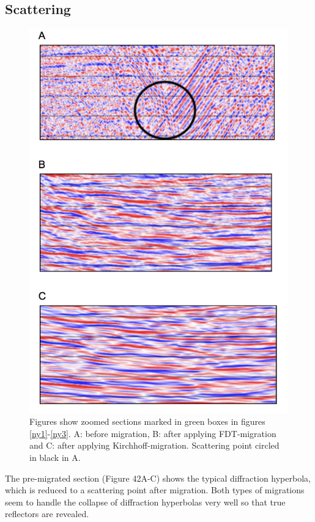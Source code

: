 \documentclass[10pt,a4paper]{article}
\begin{document}
\subsection{Scattering}

\begin{figure}[H]
\includegraphics[scale=0.4]{ny7.jpg}
\caption{Figures show zoomed sections marked in green boxes in figures \ref{ny1}-\ref{ny3}. 
A: before migration, B: after applying FDT-migration and C: after applying Kirchhoff-migration. Scattering point circled in black in A.}
\label{ny7}
\end{figure}

\noindent The pre-migrated section (Figure 42A-C) shows the typical diffraction hyperbola, which is reduced to a scattering point after migration. Both types of migrations seem to handle the collapse of diffraction hyperbolas very well so that true reflectors are revealed. 
\end{document}
